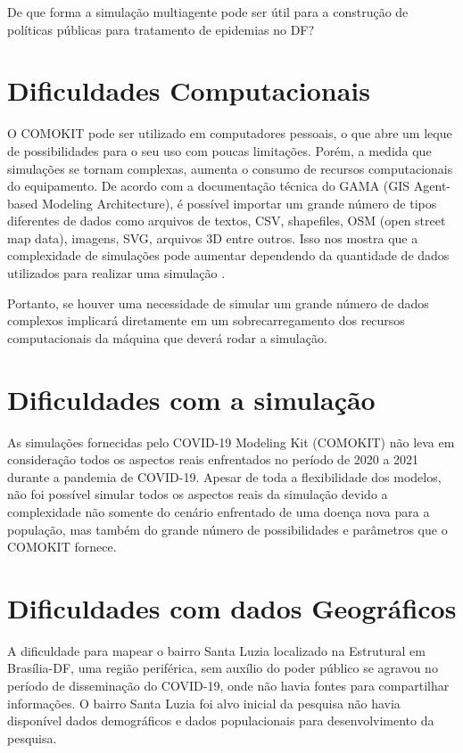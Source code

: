 De que forma a simulação multiagente pode ser útil para a construção de políticas públicas para tratamento de epidemias no DF?

\section{Dificuldades Computacionais}

O COMOKIT pode ser utilizado em computadores pessoais, o que abre um leque de possibilidades para o seu uso com poucas limitações. Porém, a medida que simulações se tornam complexas, aumenta o consumo de recursos computacionais do equipamento. De acordo com a documentação técnica do GAMA (GIS Agent-based Modeling Architecture), é possível importar um grande número de tipos diferentes de dados como arquivos de textos, CSV, shapefiles, OSM (open street map data), imagens, SVG, arquivos 3D entre outros. Isso nos mostra que a complexidade de simulações pode aumentar dependendo da quantidade de dados utilizados para realizar uma simulação \cite{gamaplataform} .

Portanto, se houver uma necessidade de simular um grande número de dados complexos implicará diretamente em um sobrecarregamento dos recursos computacionais da máquina que deverá rodar a simulação.


\section{Dificuldades com a  simulação}

As simulações fornecidas pelo COVID-19 Modeling Kit (COMOKIT) não leva em consideração todos os aspectos reais enfrentados no período de 2020 a 2021 durante a pandemia de COVID-19. Apesar de toda a flexibilidade dos modelos, não foi possível simular todos os aspectos reais da simulação devido a complexidade não somente do cenário enfrentado de uma doença nova para a população, mas também do grande número de possibilidades e parâmetros que o COMOKIT fornece.

\section{Dificuldades com dados Geográficos}

A dificuldade para mapear o bairro Santa Luzia localizado na Estrutural em Brasília-DF, uma região periférica, sem auxílio do poder público se agravou no período de disseminação do COVID-19, onde não havia fontes para compartilhar informações. O bairro Santa Luzia foi alvo inicial da pesquisa não havia disponível dados demográficos e dados populacionais para desenvolvimento da pesquisa.


